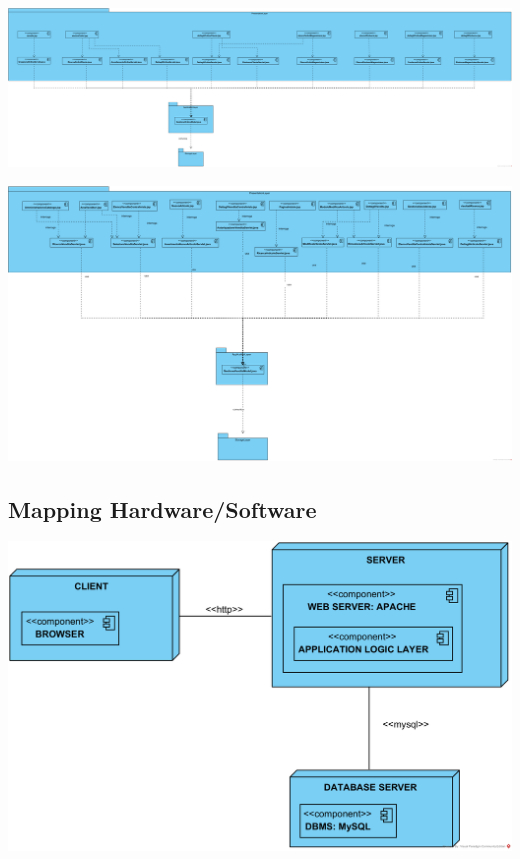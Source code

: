 \documentclass[12pt,a4paper]{article}
\begin{document}
\begin{center}
\includegraphics[width=\textwidth]{GestioneOrdine}
\end{center}

\begin{center}
\includegraphics[width=\textwidth]{GestioneVendita}
\end{center}

\newpage

\subsection{Mapping Hardware/Software}
\begin{center}
\includegraphics[height=0.34\textheight]{MappingHardWare_Software}
\end{center}
\end{document}
